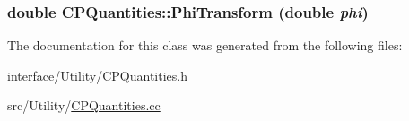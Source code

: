 \label{classCPQuantities_a778283bd3af9c19d9498d9763d0facb5}
\hypertarget{classCPQuantities_a5e9cd0d191719349777eb5d8b5bc919c}{
\subsubsection[{PhiTransform}]{\setlength{\rightskip}{0pt plus 5cm}double CPQuantities::PhiTransform (double {\em phi})}}
\label{classCPQuantities_a5e9cd0d191719349777eb5d8b5bc919c}


The documentation for this class was generated from the following files:\begin{DoxyCompactItemize}
\item 
interface/Utility/\hyperlink{CPQuantities_8h}{CPQuantities.h}\item 
src/Utility/\hyperlink{CPQuantities_8cc}{CPQuantities.cc}\end{DoxyCompactItemize}
